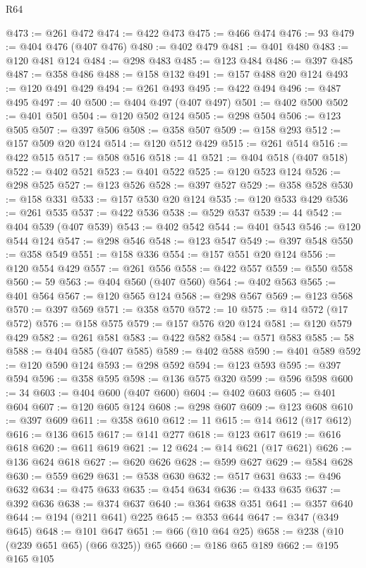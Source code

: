 \begin{lexlean}{R64}
\begin{coremodule}
@473 := @261 @472
@474 := @422 @473
@475 := @466 @474
@476 := 93
@479 := @404 @476 (@407 @476)
@480 := @402 @479
@481 := @401 @480
@483 := @120 @481 @124
@484 := @298 @483
@485 := @123 @484
@486 := @397 @485
@487 := @358 @486
@488 := @158 @132
@491 := @157 @488 @20 @124
@493 := @120 @491 @429
@494 := @261 @493
@495 := @422 @494
@496 := @487 @495
@497 := 40
@500 := @404 @497 (@407 @497)
@501 := @402 @500
@502 := @401 @501
@504 := @120 @502 @124
@505 := @298 @504
@506 := @123 @505
@507 := @397 @506
@508 := @358 @507
@509 := @158 @293
@512 := @157 @509 @20 @124
@514 := @120 @512 @429
@515 := @261 @514
@516 := @422 @515
@517 := @508 @516
@518 := 41
@521 := @404 @518 (@407 @518)
@522 := @402 @521
@523 := @401 @522
@525 := @120 @523 @124
@526 := @298 @525
@527 := @123 @526
@528 := @397 @527
@529 := @358 @528
@530 := @158 @331
@533 := @157 @530 @20 @124
@535 := @120 @533 @429
@536 := @261 @535
@537 := @422 @536
@538 := @529 @537
@539 := 44
@542 := @404 @539 (@407 @539)
@543 := @402 @542
@544 := @401 @543
@546 := @120 @544 @124
@547 := @298 @546
@548 := @123 @547
@549 := @397 @548
@550 := @358 @549
@551 := @158 @336
@554 := @157 @551 @20 @124
@556 := @120 @554 @429
@557 := @261 @556
@558 := @422 @557
@559 := @550 @558
@560 := 59
@563 := @404 @560 (@407 @560)
@564 := @402 @563
@565 := @401 @564
@567 := @120 @565 @124
@568 := @298 @567
@569 := @123 @568
@570 := @397 @569
@571 := @358 @570
@572 := 10
@575 := @14 @572 (@17 @572)
@576 := @158 @575
@579 := @157 @576 @20 @124
@581 := @120 @579 @429
@582 := @261 @581
@583 := @422 @582
@584 := @571 @583
@585 := 58
@588 := @404 @585 (@407 @585)
@589 := @402 @588
@590 := @401 @589
@592 := @120 @590 @124
@593 := @298 @592
@594 := @123 @593
@595 := @397 @594
@596 := @358 @595
@598 := @136 @575 @320
@599 := @596 @598
@600 := 34
@603 := @404 @600 (@407 @600)
@604 := @402 @603
@605 := @401 @604
@607 := @120 @605 @124
@608 := @298 @607
@609 := @123 @608
@610 := @397 @609
@611 := @358 @610
@612 := 11
@615 := @14 @612 (@17 @612)
@616 := @136 @615
@617 := @141 @277
@618 := @123 @617
@619 := @616 @618
@620 := @611 @619
@621 := 12
@624 := @14 @621 (@17 @621)
@626 := @136 @624 @618
@627 := @620 @626
@628 := @599 @627
@629 := @584 @628
@630 := @559 @629
@631 := @538 @630
@632 := @517 @631
@633 := @496 @632
@634 := @475 @633
@635 := @454 @634
@636 := @433 @635
@637 := @392 @636
@638 := @374 @637
@640 := @364 @638 @351
@641 := @357 @640
@644 := @194 (@211 @641) @225
@645 := @353 @644
@647 := @347 (@349 @645)
@648 := @101 @647
@651 := @66 (@10 @64 @25)
@658 := @238 (@10 (@239 @651 @65) (@66 @325)) @65
@660 := @186 @65 @189
@662 := @195 @165 @105

\end{coremodule}
\end{lexlean}
